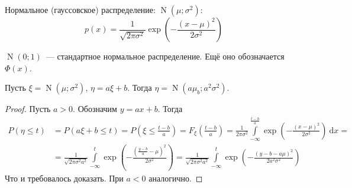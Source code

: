 \documentclass{article}
\begin{document}
    \begin{example}
        \label{Нормальное распределение}
        \label{Гауссовское распределение}
        \label{N}
        Нормальное (гауссовское) распределение: $\operatorname{N}(\mu;\sigma^2)$:
        $$
        p(x)=\frac1{\sqrt{2\pi\sigma^2}}\exp\left(-\frac{(x-\mu)^2}{2\sigma^2}\right)
        $$
        \begin{figure}[H]
        \end{figure}\noindent
        $\operatorname{N}(0;1)$~--- стандартное нормальное распределение. Ещё оно обозначается $\Phi(x)$.
    \end{example}
    \begin{claim}
        Пусть $\xi=\operatorname{N}(\mu;\sigma^2)$, $\eta=a\xi+b$. Тогда
        $\eta=\operatorname{N}(a\mu_b;a^2\sigma^2)$.
    \end{claim}
    \begin{proof}
        Пусть $a>0$. Обозначим $y=ax+b$. Тогда
        \[\begin{split}
            P(\eta\leqslant t)&=P(a\xi+b\leqslant t)=P(\xi\leqslant\frac{t-b}a)=F_\xi(\frac{t-b}a)=\frac1{2\pi\sigma^2}\int\limits_{-\infty}^{\frac{t-b}a}\exp\left(-\frac{(x-\mu)^2}{2\sigma^2}\right)~\mathrm dx=\\
            &=\frac1{\sqrt{2\pi\sigma^2a^2}}\int\limits_{-\infty}^t\exp\left(-\frac{(\frac{y-b}a-\mu)^2}{2\sigma^2}\right)=\frac1{\sqrt{2\pi\sigma^2a^2}}\int\limits_{-\infty}^t\exp\left(-\frac{(y-b-a\mu)^2}{2a^2\sigma^2}\right)
        \end{split}\]
        Что и требовалось доказать. При $a<0$ аналогично.
    \end{proof}
\end{document}
